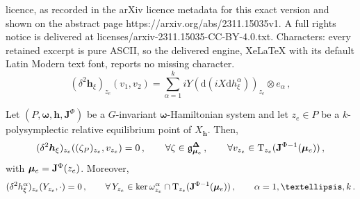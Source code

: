 \documentclass[10pt,a4paper]{amsart}
\newcommand{\T}{\mathrm{T}}
\newcommand{\bh}{{\boldsymbol{h}}}
\newcommand{\bomega}{{\boldsymbol{\omega}}}
\newcommand{\inn}{i}
\renewcommand{\d}{\mathrm{d}}
\begin{document}
licence, as recorded in the arXiv licence metadata for this exact version and shown on the abstract page https://arxiv.org/abs/2311.15035v1. A full rights notice is delivered at licenses/arxiv-2311.15035-CC-BY-4.0.txt. Characters: every retained excerpt is pure ASCII, so the delivered engine, XeLaTeX with its default Latin Modern text font, reports no missing character.
\begin{equation}
\label{Eq::SecVarf}
\left(\delta^2 \boldsymbol{h}_\xi\right)_{z_e}(v_1,v_2)=\sum^k_{\alpha=1}\inn{Y}\left(\d\left(\inn{X}\d h^\alpha_\xi\right)\right)_{z_e}\otimes e_\alpha\,,
\end{equation}

\begin{proposition}
\label{Prop::GaugeDir}
     Let $(P,\bomega,\bh,\mathbf{J}^\Phi)$ be a $G$-invariant $\bomega$-Hamiltonian system and let $z_e\in P$ be a $k$-polysymplectic relative equilibrium point of $X_{\bh}$. Then,
    \[ (\delta^2\boldsymbol{h}_\xi)_{z_e}((\zeta_P)_{z_e},v_{z_e})=0\,,\qquad \forall \zeta\in \mathfrak{g}^{\boldsymbol{\Delta}}_{\boldsymbol{\mu}_e}\,,\qquad \forall v_{z_e}\in \T_{z_e}({\bf J}^{\Phi-1}({\bm \mu}_e))\,,
    \]
    with ${\bm \mu}_e={\bf J}^{\Phi}(z_e)$. Moreover,
     \begin{equation}\label{eq:SecDeg} (\delta^2{h}^\alpha_\xi)_{z_e}(Y_{z_e},\cdot)=0\,,\qquad \forall \,Y_{z_e}\in \ker \omega_{z_e}^\alpha\cap \T_{z_e}({\bf J}^{\Phi-1}(\bm\mu_e))\,,\qquad \alpha=1,\ldots,k\,.
    \end{equation}
\end{proposition}
\end{document}
